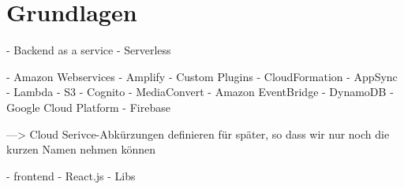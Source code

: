 \chapter{Grundlagen}

- Backend as a service
- Serverless

- Amazon Webservices
  - Amplify
  - Custom Plugins
  - CloudFormation
  - AppSync
  - Lambda
  - S3
  - Cognito
  - MediaConvert
  - Amazon EventBridge
  - DynamoDB
- Google Cloud Platform
  - Firebase

---> Cloud Serivce-Abkürzungen definieren für später, so dass wir nur noch die kurzen Namen nehmen können


- frontend
  - React.js
  - Libs